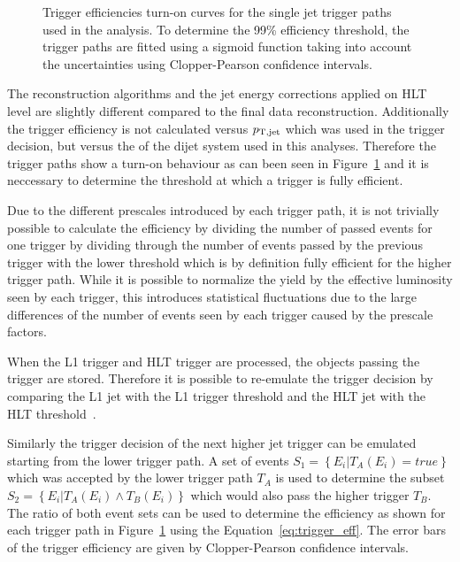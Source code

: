 \begin{figure}[htbp]
    \caption[Turn-on curves of single jet HLT trigger paths]{Trigger efficiencies turn-on curves for the single jet trigger
    paths used in the analysis. To determine the 99\% efficiency threshold, the
    trigger paths are fitted using a sigmoid function taking into account the
    uncertainties using Clopper-Pearson confidence intervals.}
    \label{fig:trigger_eff}
\end{figure}

The reconstruction algorithms and the jet energy corrections applied on HLT
level are slightly different compared to the final data reconstruction.
Additionally the trigger efficiency is not calculated versus $p_{\mathrm{T,jet}}$ which was
used in the trigger decision, but versus the \ptavg of the dijet system used in
this analyses. Therefore the trigger paths show a turn-on behaviour as can been seen in
Figure~\ref{fig:trigger_eff} and it is neccessary to determine the threshold at
which a trigger is fully efficient.

Due to the different prescales introduced by each trigger path, it is not
trivially possible to calculate the efficiency by dividing the number of passed events for
one trigger by dividing through the number of events passed by the previous
trigger with the lower \pt threshold which is by definition fully efficient for
the higher trigger path. While it is possible to normalize the yield by the
effective luminosity seen by each trigger, this introduces statistical
fluctuations due to the large differences of the number of events seen by each
trigger caused by the prescale factors.

When the L1 trigger and HLT trigger are processed, the objects passing the
trigger are stored. Therefore it is possible to re-emulate the trigger decision
by comparing the L1 jet \pt with the L1 trigger threshold and the HLT jet \pt
with the HLT threshold~\cite{Stober:2012abc}.

Similarly the trigger decision of the next higher jet trigger can be emulated
starting from the lower trigger path. A set of events $S_1 = \left\{E_i | T_A
(E_i) = true \right\}$ which was accepted  by the lower trigger path $T_A$ is
used to determine the subset $S_2 = \left\{E_i|T_A(E_i) \wedge  T_B(E_i)
\right\}$ which would also pass the higher trigger $T_B$. The ratio of both
event sets can be used to determine the efficiency as shown for each trigger
path in Figure~\ref{fig:trigger_eff} using the Equation~\ref{eq:trigger_eff}.
The error bars of the trigger efficiency are given by Clopper-Pearson confidence
intervals.

